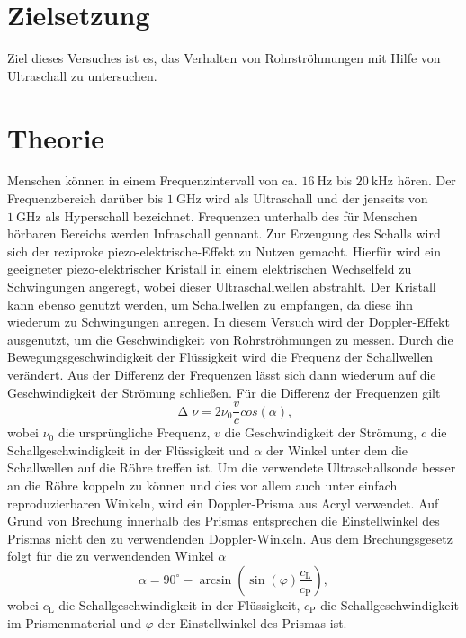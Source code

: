 \section{Zielsetzung}
\label{sec:Zielsetzung}

Ziel dieses Versuches ist es, das Verhalten von Rohrströhmungen mit Hilfe von Ultraschall zu untersuchen.

\section{Theorie}
\label{sec:Theorie}

Menschen können in einem Frequenzintervall von ca. $\SI{16}{\hertz}$ bis $\SI{20}{\kilo\hertz}$ hören. Der Frequenzbereich darüber bis $\SI{1}{\giga\hertz}$ wird als
Ultraschall und der jenseits von $\SI{1}{\giga\hertz}$ als Hyperschall bezeichnet. Frequenzen unterhalb des für Menschen hörbaren Bereichs werden Infraschall gennant.
\newline
Zur Erzeugung des Schalls wird sich der reziproke piezo-elektrische-Effekt zu Nutzen gemacht. Hierfür wird ein geeigneter piezo-elektrischer Kristall in einem
elektrischen Wechselfeld zu Schwingungen angeregt, wobei dieser Ultraschallwellen abstrahlt. Der Kristall kann ebenso genutzt werden, um Schallwellen zu empfangen,
da diese ihn wiederum zu Schwingungen anregen.
\newline
In diesem Versuch wird der Doppler-Effekt ausgenutzt, um die Geschwindigkeit von Rohrströhmungen zu messen. Durch die Bewegungsgeschwindigkeit der Flüssigkeit wird
die Frequenz der Schallwellen verändert. Aus der Differenz der Frequenzen lässt sich dann wiederum auf die Geschwindigkeit der Strömung schließen.
Für die Differenz der Frequenzen gilt
\begin{equation}
    \upDelta \nu = 2\nu_0 \frac{v}{c} cos(\alpha),
    \label{eqn:df}
\end{equation}
\noindent
wobei $\nu_0$ die ursprüngliche Frequenz, $v$ die Geschwindigkeit der Strömung, $c$ die Schallgeschwindigkeit in der Flüssigkeit und $\alpha$ der Winkel unter dem die
Schallwellen auf die Röhre treffen ist.
\newline\newline
Um die verwendete Ultraschallsonde besser an die Röhre koppeln zu können und dies vor allem auch unter einfach reproduzierbaren Winkeln, wird ein Doppler-Prisma aus
Acryl verwendet. Auf Grund von Brechung innerhalb des Prismas entsprechen die Einstellwinkel des Prismas nicht den zu verwendenden Doppler-Winkeln. Aus dem
Brechungsgesetz folgt für die zu verwendenden Winkel $\alpha$
\begin{equation}
    \alpha = 90^\circ - \arcsin(\sin(\varphi)\frac{c_\text{L}}{c_\text{P}}),
    \label{eqn:alpha}
\end{equation}
\noindent
wobei $c_\text{L}$ die Schallgeschwindigkeit in der Flüssigkeit, $c_\text{P}$ die Schallgeschwindigkeit im Prismenmaterial und $\varphi$ der Einstellwinkel des Prismas ist.

\cite{AnleitungUS3}
